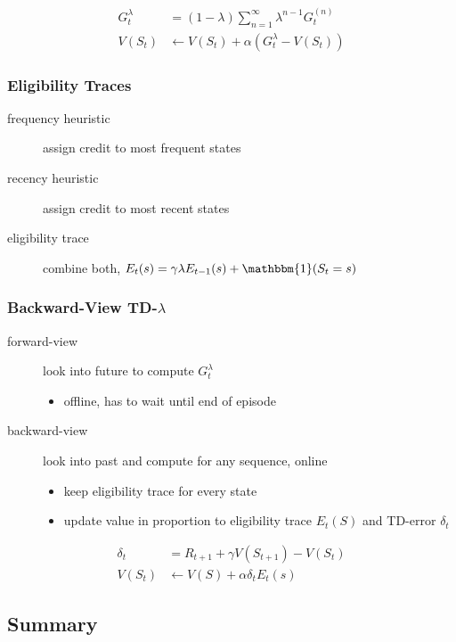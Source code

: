 \documentclass[]{article}
\theoremstyle{definition}
\begin{document}
\begin{align*}
    G_t^{\lambda} &= (1 - \lambda) \sum_{n=1}^\infty \lambda^{n-1} G_t^{(n)} \\
    V(S_t) &\gets V(S_t) + \alpha (G_t^\lambda - V(S_t))
\end{align*}

\subsubsection{Eligibility Traces}%
\label{ssub:eligibility_traces}
\begin{description}
    \item[frequency heuristic] assign credit to most frequent states
    \item[recency heuristic] assign credit to most recent states
    \item[eligibility trace] combine both, $E_t(s) = \gamma \lambda E_{t-1}(s) + \mathbbm{1} (S_t = s)$
\end{description}

\subsubsection{Backward-View TD-$\lambda$}%
\label{ssub:backward-view}

\begin{description}
    \item[forward-view] look into future to compute $G_t^\lambda$
        \begin{itemize}
            \item offline, has to wait until end of episode
        \end{itemize}
    \item[backward-view] look into past and compute for any sequence, online
        \begin{itemize}
            \item keep eligibility trace for every state
            \item update value in proportion to eligibility trace $E_t(S)$ and TD-error $\delta_t$
        \end{itemize}
\end{description}
\begin{align*}
    \delta_t &= R_{t+1} + \gamma V(S_{t+1}) - V(S_t) \\
    V(S_t) &\gets V(S) + \alpha \delta_t E_t(s)
\end{align*}

\subsection{Summary}%
\label{sub:summary}
\end{document}
